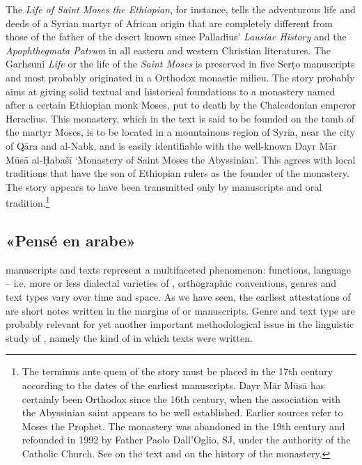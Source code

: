 \documentclass[output=paper,colorlinks,citecolor=brown,arabfont,syriacfont]{langscibook}
\begin{document}
The  \textit{Life of Saint Moses the Ethiopian}, for instance, tells the adventurous life and deeds of a Syrian martyr of African origin that are completely different from those of the father of the desert known since Palladius' \textit{Lausiac History} and the \textit{Apophthegmata Patrum} in all eastern and western Christian literatures. The Garhsuni \textit{Life} or the life of the  \textit{Saint Moses} is preserved in five Serṭo manuscripts and most probably originated in a  Orthodox monastic milieu. The story probably aims at giving solid textual and historical foundations to a monastery named after a certain Ethiopian monk Moses, put to death by the Chalcedonian emperor Heraclius. This monastery, which in the text is said to be founded on the tomb of the martyr Moses, is to be located in a mountainous region of Syria, near the city of Qāra and al-Nabk, and is easily identifiable with the well-known Dayr Mār Mūsā al-Ḥabašī `Monastery of Saint Moses the Abyssinian'. This agrees with local traditions that have the son of Ethiopian rulers as the founder of the monastery. The story appears to have been transmitted only by  manuscripts and oral tradition.\footnote{%
The terminus ante quem of the story must be placed in the 17th century according to the dates of the earliest manuscripts. Dayr Mār Mūsā has certainly been  Orthodox since the 16th century, when the association with the Abyssinian saint appears to be well established. Earlier sources refer to Moses the Prophet. The monastery was abandoned in the 19th century and refounded in 1992 by Father Paolo Dall'Oglio, SJ, under the authority of the  Catholic Church. See \citet{caraglio2020-2021} on the  text and \citet{kaufhold1995} on the history of the monastery.}

    \subsection{«Pensé en arabe»}\label{ch.3.6.ss.2.3}

 manuscripts and texts represent a multifaceted phenomenon: functions, language -- i.e. more or less dialectal varieties of , orthographic conventions, genres and text types vary over time and space. As we have seen, the earliest attestations of  are short notes written in the margins of  or  manuscripts. Genre and text type are probably relevant for yet another important methodological issue in the linguistic study of , namely the kind of  in which texts were written. 
\end{document}
